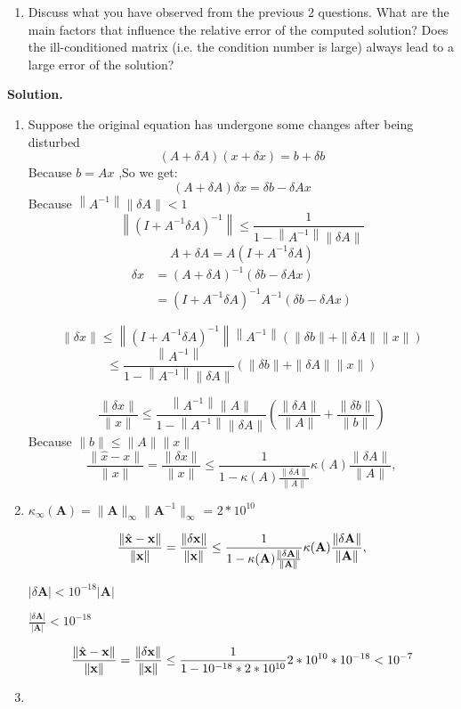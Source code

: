 \documentclass[english,onecolumn]{IEEEtran}
\begin{document}
\begin{enumerate}
    
    \item Discuss what you have observed from the previous 2 questions. What are the main factors that influence the relative error of the computed solution? Does the ill-conditioned matrix (i.e. the condition number is large) always lead to a large error of the solution?     
\end{enumerate}

\noindent\textbf{Solution.}
\begin{enumerate}
    \item
  Suppose the original equation has undergone some changes after being disturbed
    $$
    (A+\delta A)(x+\delta x)=b+\delta b
    $$
    Because $b=A x$ ,So we get:
    $$
    (A+\delta A) \delta x=\delta b-\delta A x
    $$
   Because $\left\|A^{-1}\right\|\|\delta A\|<1$
    $$
    \left\|\left(I+A^{-1} \delta A\right)^{-1}\right\| \leqslant \frac{1}{1-\left\|A^{-1}\right\|\|\delta A\|}
    $$
   $$A+\delta A=A\left(I+A^{-1} \delta A\right)$$
    $$
    \begin{aligned}
    	\delta x &=(A+\delta A)^{-1}(\delta b-\delta A x) \\
    	&=\left(I+A^{-1} \delta A\right)^{-1} A^{-1}(\delta b-\delta A x)
    \end{aligned}
    $$
    
    $$
    \|\delta x\| \leqslant\left\|\left(I+A^{-1} \delta A\right)^{-1}\right\|\left\|A^{-1}\right\|(\|\delta b\|+\|\delta A\|\|x\|)
    $$
    $$
    \leqslant \frac{\left\|A^{-1}\right\|}{1-\left\|A^{-1}\right\|\|\delta A\|}(\|\delta b\|+\|\delta A\|\|x\|)
    $$
     
    $$
    \frac{\|\delta x\|}{\|x\|} \leqslant \frac{\left\|A^{-1}\right\|\|A\|}{1-\left\|A^{-1}\right\|\|\delta A\|}\left(\frac{\|\delta A\|}{\|A\|}+\frac{\|\delta b\|}{\|b\|}\right)
    $$
   Because $\|b\| \leqslant\|A\|\|x\|$
    $$
     \frac{\|\hat{x}-x\|}{\|x\|} = \frac{\|\delta x\|}{\|x\|} \leq \frac{1}{1-\kappa(A)\frac{\|\delta A\|}{\|A\|}}\kappa(A)\frac{\|\delta A\|}{\|A\|},
     $$
    \item 
    $\kappa_\infty(\mathbf{A}) = \|\mathbf{A}\|_\infty\|\mathbf{A}^{-1}\|_\infty$ = $2*10^{10}$
    
        \begin{equation*}
    	\frac{\|\hat{\mathbf{x}}-\mathbf{x}\|}{\|\mathbf{x}\|} = \frac{\|\delta \bf{x}\|}{\|\bf{x}\|} \leq \frac{1}{1-\kappa(\mathbf{A})\frac{\|\delta \mathbf{A}\|}{\|\mathbf{A}\|}}\kappa(\mathbf{A})\frac{\|\delta \mathbf{A}\|}{\|\mathbf{A}\|},
    \end{equation*}

	$|\delta\mathbf{A}|<10^{-18}|\mathbf{A}|$
	
	$\frac{|\delta\mathbf{A}|}{|\mathbf{A}|}<10^{-18}$
	
	 \begin{equation*}
		\frac{\|\hat{\mathbf{x}}-\mathbf{x}\|}{\|\mathbf{x}\|} = \frac{\|\delta \bf{x}\|}{\|\bf{x}\|} \leq \frac{1}{1-10^{-18}*2*10^{10}}2*10^{10}*10^{-18}<10^{-7}
	\end{equation*}
    \item
\end{enumerate}
\end{document}

